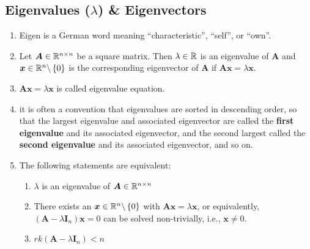 \subsection{Eigenvalues ($\lambda$) \& Eigenvectors}

\begin{enumerate}
    \item Eigen is a German word meaning “characteristic”, “self”, or “own”.
    \hfill \cite{mfml/book/mml/Deisenroth-Faisal-Ong}

    \item
    \begin{definition}
        Let $\bm{A} \in \mathbb{R}^{n\times n}$ be a square matrix.
        Then $\lambda \in \mathbb{R}$ is an eigenvalue of $\bm{A}$ and $\bm{x} \in \mathbb{R}^n\backslash\left\{0\right\}$ is the corresponding eigenvector of $\bm{A}$ if
        $\bm{Ax} = \lambda \bm{x}$.
        \hfill \cite{mfml/book/mml/Deisenroth-Faisal-Ong}
    \end{definition}

    \item $\bm{Ax} = \lambda \bm{x}$ is called eigenvalue equation.
    \hfill \cite{mfml/book/mml/Deisenroth-Faisal-Ong}

    \item it is often a convention that eigenvalues are sorted in descending order, so that the largest eigenvalue and associated eigenvector are called the \textbf{first eigenvalue} and its associated eigenvector, and the second largest called the \textbf{second eigenvalue} and its associated eigenvector, and so on.
    \hfill \cite{mfml/book/mml/Deisenroth-Faisal-Ong}

    \item The following statements are equivalent:
    \begin{enumerate}
        \item $\lambda$ is an eigenvalue of $\bm{A} \in \mathbb{R}^{n\times n}$
        \hfill \cite{mfml/book/mml/Deisenroth-Faisal-Ong}

        \item There exists an $\bm{x} \in \mathbb{R}^n\backslash\left\{0\right\}$ with $\bm{Ax} = \lambda \bm{x}$, or equivalently, $(\bm{A} - \lambda \bm{I}_n)\bm{x} = 0$ can be solved non-trivially, i.e., $\bm{x} \neq 0$.
        \hfill \cite{mfml/book/mml/Deisenroth-Faisal-Ong}

        \item $rk(\bm{A} - \lambda \bm{I}_n) < n$
        \hfill \cite{mfml/book/mml/Deisenroth-Faisal-Ong}


\end{enumerate}
\end{enumerate}
